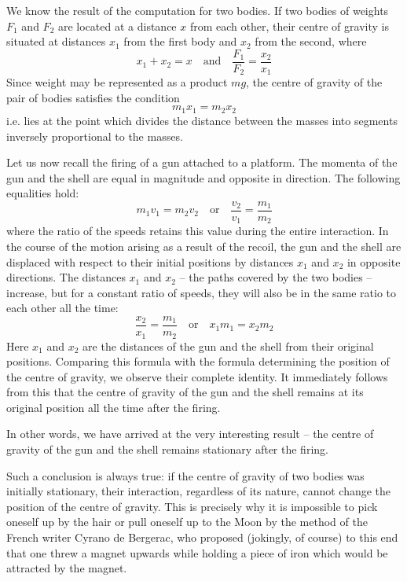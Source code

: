 We know the result of the computation for two bodies.
If two bodies of weights $F_{1}$ and $F_{2}$ are located at a distance
$x$ from each other, their centre of gravity is situated at distances $x_{1}$ from the first body and $x_{2}$ from the second,
where
 \begin{equation*}%
x_{1} + x_{2} = x \quad \textrm{and} \quad \dfrac{F_{1}}{F_{2}} = \dfrac{x_{2}}{x_{1}}
 \end{equation*}
Since weight may be represented as a product $mg$, the centre of gravity of the pair of bodies satisfies the condition
 \begin{equation*}%
m_{1}x_{1} = m_{2}x_{2}
 \end{equation*}
i.e. lies at the point which divides the distance between
the masses into segments inversely proportional to the
masses.

Let us now recall the firing of a gun attached to a platform. The momenta of the gun and the shell are equal in
magnitude and opposite in direction. The following equalities hold:
 \begin{equation*}%
 m_{1} v_{1} = m_{2} v_{2}  \quad \textrm{or} \quad \dfrac{v_{2}}{v_{1}} = \dfrac{m_{1}}{m_{2}} 
 \label{ellipse}
 \end{equation*}
where the ratio of the speeds retains this value during the entire interaction. In the course of the motion arising as a result of the recoil, the gun and the shell are displaced with respect to their initial positions by distances $x_{1}$ and $x_{2}$ in opposite directions. The distances $x_{1}$ and $x_{2}$ -- the paths covered by the two bodies -- increase, but for a constant ratio of speeds, they will also be in the same ratio to each other all the time:
 \begin{equation*}%
\dfrac{x_{2}}{x_{1}} = \dfrac{m_{1}}{m_{2}} \quad \textrm{or} \quad x_{1} m_{1} = x_{2} m_{2}
 \end{equation*}
Here $x_{1}$ and $x_{2}$ are the distances of the gun and the shell from their original positions. Comparing this formula
with the formula determining the position of the centre of gravity, we observe their complete identity. It immediately follows from this that the centre of gravity of the gun and the shell remains at its original position all the time after the firing.

In other words, we have arrived at the very interesting result -- the centre of gravity of the gun and the shell remains stationary after the firing.

Such a conclusion is always true: if the centre of gravity of two bodies was initially stationary, their interaction, regardless of its nature, cannot change the position of the centre of gravity. This is precisely why it is impossible to pick oneself up by the hair or pull oneself up to the Moon by the method of the French writer Cyrano de Bergerac, who proposed (jokingly, of course) to this end that one threw a magnet upwards while holding a piece of iron which would be attracted by the magnet.

